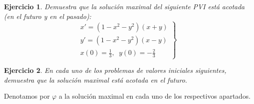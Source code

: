 \documentclass[12pt]{article}
\newtheorem{ejercicio}{Ejercicio}
\theoremstyle{definition}
\theoremstyle{remark}
\begin{document}
\begin{ejercicio}
Demuestra que la solución maximal del siguiente PVI está acotada (en el futuro y en el pasado):
\[
\left.
\begin{array}{c}
x'=(1-x^2-y^2)(x+y)\\
y'=(1-x^2-y^2)(x-y)\\
x(0)=\frac{1}{3}, \;\; y(0)=-\frac{2}{3}
\end{array}
\right\}
\]
\end{ejercicio}

\begin{ejercicio}
En cada uno de los problemas de valores iniciales siguientes, demuestra que la solución maximal está acotada en el futuro.
\end{ejercicio}

Denotamos por $\varphi$ a la solución maximal en cada uno de los respectivos apartados.
\end{document}
